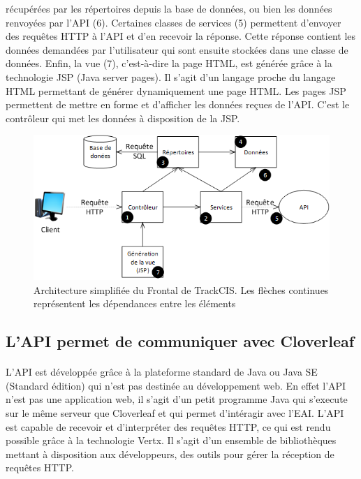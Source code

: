 			récupérées par les répertoires depuis la base de données, ou bien les
			données renvoyées par l'API (6). Certaines classes de services (5)
			permettent d'envoyer des requêtes HTTP à l'API et d'en recevoir la réponse.
			Cette réponse contient les données demandées par l'utilisateur qui sont
			ensuite stockées dans une classe de données. Enfin, la vue (7), c'est-à-dire
			la page HTML, est générée grâce à la technologie JSP (Java server pages). Il
			s'agit d'un langage proche du langage HTML permettant de générer
			dynamiquement une page HTML.
			Les pages JSP permettent de mettre en forme et d'afficher les données reçues
			de l'API. C'est le contrôleur qui met les données à disposition de la JSP.
			\begin{figure}[H]
				\centering
				\includegraphics[width=15cm]{../img/part3/archi_actuelle_front.png}
				\caption{\label{archi_actuelle_front} Architecture simplifiée du Frontal
				de TrackCIS. Les flèches continues représentent les dépendances entre les
				éléments}
			\end{figure}
			
		\subsection{L'API permet de communiquer avec Cloverleaf}
			\paragraph{}%
			L'API est développée grâce à la plateforme standard de Java ou Java SE
			(Standard édition) qui n'est pas destinée au développement web. En effet
			l'API n'est pas une application web, il s'agit d'un petit programme Java qui
			s'execute sur le même serveur que Cloverleaf et qui permet d'intéragir avec
			l'EAI. L'API est capable de recevoir et d'interpréter des requêtes
			HTTP, ce qui est rendu possible grâce à la technologie Vertx. Il s'agit
			d'un ensemble de bibliothèques mettant à disposition aux
			développeurs, des outils pour gérer la réception de requêtes HTTP.
			
